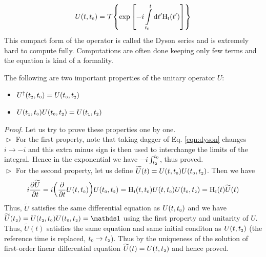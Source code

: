 \begin{equation}\label{eqn:dyson}
    U(t,{t_{\text{\tiny 0}}}) = \mathcal T\qty{\exp \qty[-i \int\limits_{t_{\text{\tiny 0}}}^t \dd t' \mathrm{H}_{\text{\tiny I}}(t')]}
\end{equation}
This compact form of the operator is called the Dyson series and is extremely hard to compute fully. Computations are often done keeping only few terms and the equation is kind of a formality. 
\begin{ffact}
    The following are two important properties of the unitary operator $U$:
\begin{itemize}
    \item $U^\dagger({t_{\text{\tiny 2}}}, {t_{\text{\tiny 0}}}) = U({t_{\text{\tiny 0}}}, {t_{\text{\tiny 2}}})$ 
    \item $U({t_{\text{\tiny 1}}}, {t_{\text{\tiny 0}}})U({t_{\text{\tiny 0}}}, {t_{\text{\tiny 2}}}) = U({t_{\text{\tiny 1}}}, {t_{\text{\tiny 2}}})$
\end{itemize}
\end{ffact}
\textit{Proof.} Let us try to prove these properties one by one. \\[0.2cm]
$\vartriangleright$ For the first property, note that taking dagger of Eq. \ref{eqn:dyson} changes $i\to -i$ and this extra minus sign is then used to interchange the limits of the integral. Hence in the exponential we have $-i \int_{{t_{\text{\tiny 2}}}}^{t_{\text{\tiny 0}}}$, thus proved. \\[0.2cm]
 $\vartriangleright$ For the second property, let us define $\widetilde{U}(t) = U(t,{t_{\text{\tiny 0}}})U({t_{\text{\tiny 0}}}, {t_{\text{\tiny 2}}})$. Then we have 
 \begin{align*}
    i \pdv{\widetilde{U}}{t} = i \qty(\pdv{t}U(t,{t_{\text{\tiny 0}}})) U({t_{\text{\tiny 0}}}, {t_{\text{\tiny 2}}}) = \mathrm{H}_{\text{\tiny I}}(t,{t_{\text{\tiny 0}}}) U(t,{t_{\text{\tiny 0}}})U({t_{\text{\tiny 0}}},{t_{\text{\tiny 2}}}) = \mathrm{H}_{\text{\tiny I}}(t) \widetilde{U}(t)
 \end{align*}
 Thus, $\widetilde{U}$ satisfies the same differential equation as $U(t,{t_{\text{\tiny 0}}})$ and we have $\widetilde{U}(\tii) = U(\tii, \tz)U(\tz, \tii) = \iden$ using the first property and unitarity of $U$.\\[0.2cm] Thus, $\widetilde{U}(t)$ satisfies the same equation and same initial conditon as $U(t,{t_{\text{\tiny 2}}})$ (the reference time is replaced, ${t_{\text{\tiny 0}}} \to {t_{\text{\tiny 2}}}$). Thus by the uniqueness of the solution of first-order linear differential equation $\widetilde{U}(t) = U(t,{t_{\text{\tiny 2}}})$ and hence proved.
